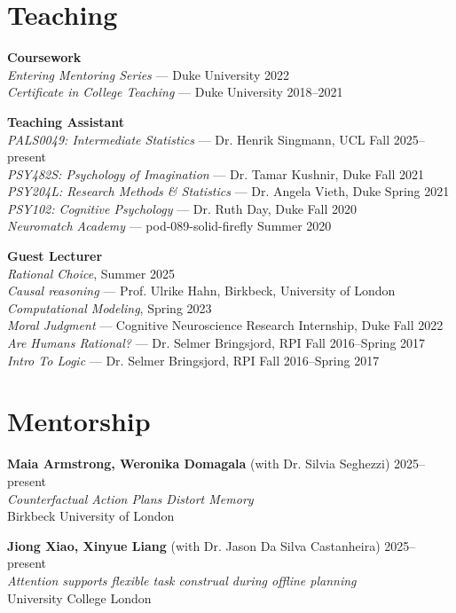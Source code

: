 \section{Teaching}
\textbf{Coursework} \\
\emph{Entering Mentoring Series} --- Duke University \hfill 2022 \\
\emph{Certificate in College Teaching} --- Duke University \hfill 2018--2021

\textbf{Teaching Assistant} \\
\emph{PALS0049: Intermediate Statistics} --- Dr. Henrik Singmann, UCL \hfill Fall 2025--present \\
\emph{PSY482S: Psychology of Imagination} --- Dr. Tamar Kushnir, Duke \hfill Fall 2021 \\
\emph{PSY204L: Research Methods \& Statistics} --- Dr. Angela Vieth, Duke \hfill Spring 2021 \\
\emph{PSY102: Cognitive Psychology} --- Dr. Ruth Day, Duke  \hfill Fall 2020 \\
\emph{Neuromatch Academy} --- pod-089-solid-firefly \hfill Summer 2020

\textbf{Guest Lecturer} \\
\emph{Rational Choice}, \hfill Summer 2025 \\
\emph{Causal reasoning} ---  Prof. Ulrike Hahn, Birkbeck, University of London \\ 
\emph{Computational Modeling},  \hfill Spring 2023 \\
\emph{Moral Judgment} --- Cognitive Neuroscience Research Internship, Duke \hfill Fall 2022 \\
\emph{Are Humans Rational?} --- Dr. Selmer Bringsjord, RPI \hfill Fall 2016--Spring 2017 \\
\emph{Intro To Logic} --- Dr. Selmer Bringsjord, RPI \hfill Fall 2016--Spring 2017

\line\section{Mentorship}
\textbf{Maia Armstrong, Weronika Domagala} (with Dr. Silvia Seghezzi) \hfill 2025--present \\
\emph{Counterfactual Action Plans Distort Memory} \\
Birkbeck University of London

\textbf{Jiong Xiao, Xinyue Liang} (with Dr. Jason Da Silva Castanheira) \hfill 2025--present \\
\emph{Attention supports flexible task construal during offline planning} \\
University College London

